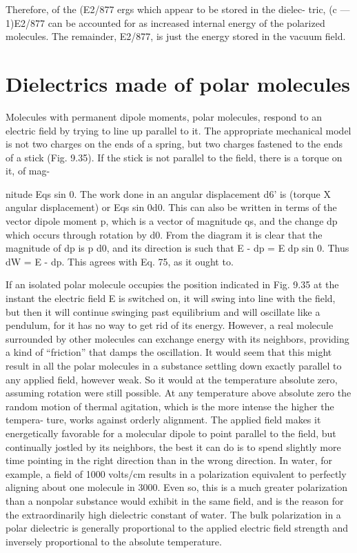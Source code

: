{{Therefore, of the (E2/877 ergs which appear to be stored in the dielec-
tric, (c  ---  1)E2/877 can be accounted for as increased internal energy
of the polarized molecules. The remainder, E2/877, is just the energy
stored in the vacuum field.

\section{Dielectrics made of polar molecules}

Molecules with permanent dipole moments, polar molecules,
respond to an electric field by trying to line up parallel to it. The
appropriate mechanical model is not two charges on the ends of a
spring, but two charges fastened to the ends of a stick (Fig. 9.35).
If the stick is not parallel to the field, there is a torque on it, of mag-

nitude Eqs sin 0. The work done in an angular displacement d6' is
(torque X angular displacement) or Eqs sin 0d0. This can also
be written in terms of the vector dipole moment p, which is a vector
of magnitude qs, and the change dp which occurs through rotation
by d0. From the diagram it is clear that the magnitude of dp is p d0,
and its direction is such that E - dp = E dp sin 0. Thus dW = E - dp.
This agrees with Eq. 75, as it ought to.

If an isolated polar molecule occupies the position indicated in
Fig. 9.35 at the instant the electric field E is switched on, it will swing
into line with the field, but then it will continue swinging past equilibrium
and will oscillate like a pendulum, for it has no way to get
rid of its energy. However, a real molecule surrounded by other
molecules can exchange energy with its neighbors, providing a kind
of ``friction'' that damps the oscillation. It would seem that this
might result in all the polar molecules in a substance settling down
exactly parallel to any applied field, however weak. So it would at
the temperature absolute zero, assuming rotation were still possible.
At any temperature above absolute zero the random motion of
thermal agitation, which is the more intense the higher the tempera-
ture, works against orderly alignment. The applied field makes it
energetically favorable for a molecular dipole to point parallel to
the field, but continually jostled by its neighbors, the best it can do
is to spend slightly more time pointing in the right direction than in
the wrong direction. In water, for example, a field of 1000 volts/cm
results in a polarization equivalent to perfectly aligning about one
molecule in 3000. Even so, this is a much greater polarization than
a nonpolar substance would exhibit in the same field, and is the
reason for the extraordinarily high dielectric constant of water. The
bulk polarization in a polar dielectric is generally proportional to
the applied electric field strength and inversely proportional to the
absolute temperature.

}}
